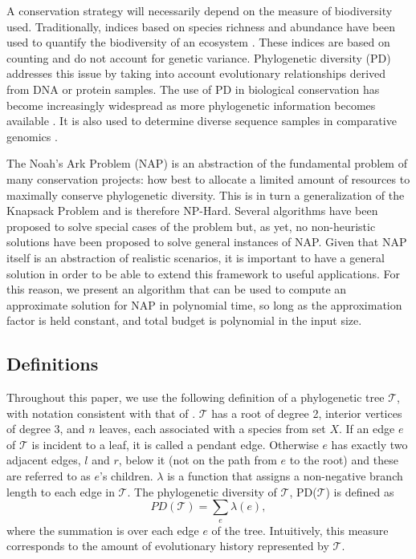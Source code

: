 \documentclass[10pt]{llncs}       \usepackage{graphicx,subfigure}
\begin{document}
A conservation strategy will necessarily 
depend on the measure of biodiversity used. 
Traditionally, indices based on species richness and abundance have been
used to quantify the biodiversity of an ecosystem \cite{magurran04}. 
These indices are based on counting and do not account for genetic variance.
Phylogenetic diversity (PD) 
\cite{faith92} addresses this issue by taking into account evolutionary
relationships derived from DNA or protein samples.  
The use of PD in biological conservation has become 
increasingly widespread as more phylogenetic information becomes 
available \cite{heard00}.  It is also used to determine diverse
sequence samples in comparative genomics \cite{pardi05}. 

The Noah's Ark Problem (NAP) \cite{weitzman98} is an abstraction of the
fundamental problem of many conservation projects:  how best to allocate
a limited amount of resources to maximally conserve phylogenetic diversity.  
This
is in turn a generalization of the Knapsack Problem \cite{garey79} and
is therefore NP-Hard.  Several algorithms have been proposed to solve special
cases of the problem but, as yet, no non-heuristic solutions have been
proposed to solve general instances of NAP.  Given that NAP itself is
an abstraction of realistic scenarios, it is important to have a general
solution in order to be able to extend this framework
 to useful applications.  For
this reason, we present an algorithm that
can be used to compute an approximate solution for NAP
in polynomial time, so long as the approximation factor is held constant, 
and total budget is polynomial in the input size.

\subsection{Definitions}

Throughout this paper, we use the following definition
of a phylogenetic tree $\mathcal{T}$, with notation consistent
with that of \cite{hartmann06}.  $\mathcal{T}$ has a root of 
degree 2, interior vertices of degree 3, and $n$ leaves, each associated
with a species from set $X$. If an edge $e$ of $\mathcal{T}$
is incident to a leaf, it is
called a pendant edge.  Otherwise $e$ has exactly two adjacent edges, 
$l$ and $r$, below it (not on the path from $e$ to the
root) and these are referred to as $e$'s children. 
$\lambda$ is a function that assigns a  non-negative branch length to each
edge in $\mathcal{T}$.  The phylogenetic
diversity of $\mathcal{T}$, PD($\mathcal{T}$) is defined as
\begin{equation}
\label{eq:pd}
PD(\mathcal{T}) = \sum_e \lambda(e),
\end{equation}
where the summation is over each edge $e$ of the tree.  Intuitively, this
measure corresponds to the amount of evolutionary history represented 
by $\mathcal{T}$.
\end{document}

